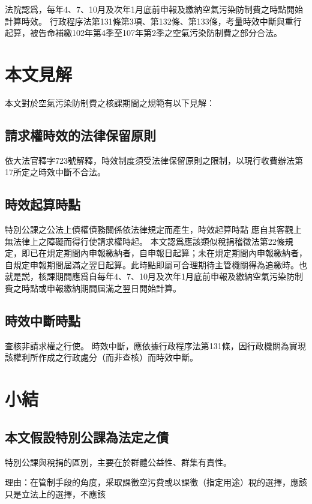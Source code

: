 \documentclass[11pt,a4paper]{article}
\begin{document}
法院認爲，每年4、7、10月及次年1月底前申報及繳納空氣污染防制費之時點開始計算時效。
行政程序法第131條第3項、第132條、第133條，考量時效中斷與重行起算，被告命補繳102年第4季至107年第2季之空氣污染防制費之部分合法。





\section{本文見解}


本文對於空氣污染防制費之核課期間之規範有以下見解：

\subsection{請求權時效的法律保留原則}
依大法官釋字723號解釋，時效制度須受法律保留原則之限制，以現行收費辦法第17所定之時效中斷不合法。

\subsection{時效起算時點}
  

特別公課之公法上債權債務關係依法律規定而產生，時效起算時點
應自其客觀上無法律上之障礙而得行使請求權時起。
本文認爲應該類似稅捐稽徵法第22條規定，即已在規定期間內申報繳納者，自申報日起算；未在規定期間內申報繳納者，自規定申報期間屆滿之翌日起算。此時點即屬可合理期待主管機關得為追繳時。也就是説，核課期間應爲自每年4、7、10月及次年1月底前申報及繳納空氣污染防制費之時點或申報繳納期間屆滿之翌日開始計算。

\subsection{時效中斷時點}
查核非請求權之行使。
時效中斷，應依據行政程序法第131條，因行政機關為實現該權利所作成之行政處分（而非查核）而時效中斷。


\section{小結}
\subsection{本文假設特別公課為法定之債}

特別公課與稅捐的區別，主要在於群體公益性、群集有責性。

理由：在管制手段的角度，采取課徵空污費或以課徵（指定用途）稅的選擇，應該只是立法上的選擇，不應該
\end{document}
